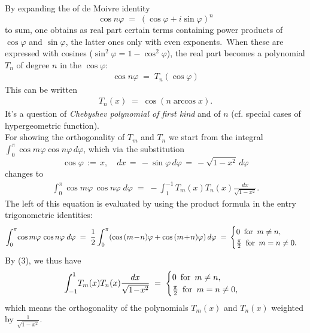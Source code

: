 \documentclass[12pt]{article}
\theoremstyle{definition}
\begin{document}
By expanding the  of de Moivre identity
$$\cos{n\varphi} \;=\; (\cos\varphi+i\sin\varphi)^n$$
to sum, one obtains as real part certain terms containing power products of $\cos\varphi$ and $\sin\varphi$, the latter ones only with even exponents.\, When these are expressed with cosines ($\sin^2\varphi = 1-\cos^2\varphi$), the real part becomes a polynomial $T_n$ of degree $n$ in the  $\cos\varphi$:
\begin{align}
\cos{n\varphi} \;=\; T_n(\cos\varphi)
\end{align}
This can be written 
\begin{align}
T_n(x) \;=\; \cos(n\arccos{x}).
\end{align}
It's a question of \emph{Chebyshev polynomial of first kind} and of  $n$ (cf. special cases of hypergeometric function).\\ 

For showing the orthogonality of $T_m$ and $T_n$ we start from the integral
$\displaystyle\int_0^\pi\cos{m\varphi}\cos{n\varphi}\,d\varphi$, which via the substitution
$$\cos\varphi \,:=\, x, \quad dx \,=\, -\sin\varphi\,d\varphi \,=\, -\sqrt{1\!-\!x^2}\,d\varphi$$
changes to
\begin{align}
\int_0^\pi\cos{m\varphi}\,\cos{n\varphi}\;d\varphi \;=\; -\!\int_1^{-1}T_m(x)T_n(x)\frac{dx}{\sqrt{1\!-\!x^2}}.
\end{align}
The left  of this equation is evaluated by using the product formula in the entry trigonometric identities:
\begin{align*}
\int_0^\pi\!\cos{m\varphi}\,\cos{n\varphi}\;d\varphi \;=\; 
\frac{1}{2}\int_0^\pi(\cos{(m\!-\!n)\varphi}+\cos{(m\!+\!n)\varphi})\,d\varphi \;=\, 
\begin{cases} 
 0 \mbox{\, for\, } m \neq n,\\ 
 \frac{\pi}{2} \mbox{\, for\, } m = n \neq 0.
\end{cases}
\end{align*}
By (3), we thus have
\begin{align*}
\int_{-1}^1\!T_m(x)T_n(x)\frac{dx}{\sqrt{1\!-\!x^2}} \;=\;
\begin{cases} 
 0 \mbox{\, for\, } m \neq n,\\ 
 \frac{\pi}{2} \mbox{\, for\, } m = n \neq 0,
\end{cases}
\end{align*}
which means the orthogonality of the polynomials $T_m(x)$ and $T_n(x)$ weighted by $\frac{1}{\sqrt{1\!-\!x^2}}$.\\
\end{document}
